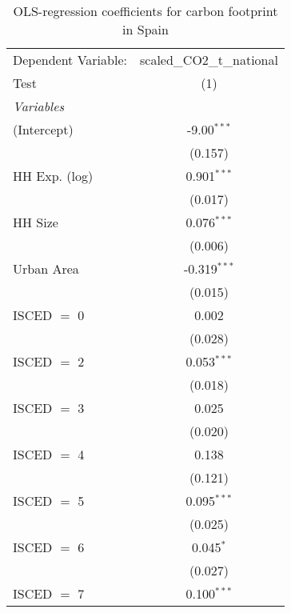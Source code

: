 
\begin{table}[htbp!]
   \centering
   \small
   \begin{adjustbox}{width = 1\textwidth, max height = 0.95\textheight, center}
      \begin{threeparttable}[b]
         \caption{\label{tab:OLS_2_ESP} OLS-regression coefficients for carbon footprint in Spain}
         \begin{tabular}{lc}
            \tabularnewline \midrule \midrule
            Dependent Variable: & scaled\_CO2\_t\_national\\     
            Test                & (1)\\  
            \midrule
            \emph{Variables}\\
            (Intercept)         & -9.00$^{***}$\\   
                                & (0.157)\\   
            HH Exp. (log)       & 0.901$^{***}$\\   
                                & (0.017)\\   
            HH Size             & 0.076$^{***}$\\   
                                & (0.006)\\   
            Urban Area          & -0.319$^{***}$\\   
                                & (0.015)\\   
            ISCED $=$ 0         & 0.002\\   
                                & (0.028)\\   
            ISCED $=$ 2         & 0.053$^{***}$\\   
                                & (0.018)\\   
            ISCED $=$ 3         & 0.025\\   
                                & (0.020)\\   
            ISCED $=$ 4         & 0.138\\   
                                & (0.121)\\   
            ISCED $=$ 5         & 0.095$^{***}$\\   
                                & (0.025)\\   
            ISCED $=$ 6         & 0.045$^{*}$\\   
                                & (0.027)\\   
            ISCED $=$ 7         & 0.100$^{***}$\\   

\end{tabular}
\end{threeparttable}
\end{adjustbox}
\end{table}

